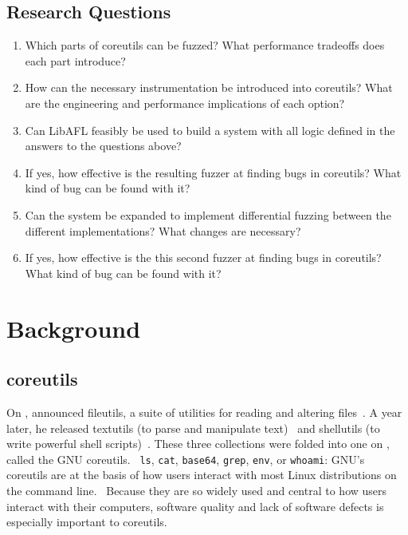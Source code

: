 \documentclass{article}
\newcommand{\code}[1]{\texttt{#1}}
\let\savedCite=\cite
\renewcommand{\cite}{\unskip~\savedCite}
\begin{document}
\begin{multicols}{2}
    \subsection{Research Questions}
    \begin{enumerate}
        \item Which parts of coreutils can be fuzzed? What performance tradeoffs does each part introduce?
        \item How can the necessary instrumentation be introduced into coreutils? What are the engineering and performance implications of each option?
        \item Can LibAFL feasibly be used to build a system with all logic defined in the answers to the questions above?
        \item If yes, how effective is the resulting fuzzer at finding bugs in coreutils? What kind of bug can be found with it?
        \item Can the system be expanded to implement differential fuzzing between the different implementations? What changes are necessary?
        \item If yes, how effective is the this second fuzzer at finding bugs in coreutils? What kind of bug can be found with it?
    \end{enumerate}

    \section{Background}
    \subsection{coreutils}
    On , \citeauthor{FileUtilsAnnouncement} announced fileutils, a suite of utilities for reading and altering files\cite{FileUtilsAnnouncement}. A year later, he released textutils (to parse and manipulate text)\cite{TextUtilsAnnouncement} and shellutils (to write powerful shell scripts)\cite{ShellUtilsAnnouncement}. These three collections were folded into one on , called the GNU coreutils.\cite{CoreUtilsAnnouncement} \code{ls}, \code{cat}, \code{base64}, \code{grep}, \code{env}, or \code{whoami}: GNU's coreutils are at the basis of how users interact with most Linux distributions on the command line.\cite{GNULinux} Because they are so widely used and central to how users interact with their computers, software quality and lack of software defects is especially important to coreutils.


\end{multicols}
\end{document}
